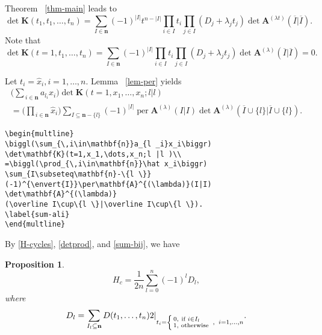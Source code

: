 \documentclass{article}
\newtheorem{prop}[thm]{Proposition}
\theoremstyle{definition}
\theoremstyle{remark}
\DeclareMathOperator{\per}{per}
\newcommand{\eval}[2][\right]{\relax
  \ifx#1\right\relax \left.\fi#2#1\rvert}
\newcommand{\envert}[1]{\left\lvert#1\right\rvert}
\begin{document}
Theorem ~\ref{thm-main} leads to
\begin{equation}\label{detK1}
\det\mathbf{K}(t_1,t_1,\dots,t_n)
=\sum_{I\in\mathbf{n}}(-1)^{\envert{I}}t^{n-\envert{I}}
\prod_{i\in I}t_i\prod_{j\in I}(D_j+\lambda_jt_j)\det\mathbf{A}
^{(\lambda t)}(\overline{I}|\overline I).
\end{equation}
Note that
\begin{equation}\label{detK2}
\det\mathbf{K}(t=1,t_1,\dots,t_n)=\sum_{I\in\mathbf{n}}(-1)^{\envert{I}}
\prod_{i\in I}t_i\prod_{j\in I}(D_j+\lambda_jt_j)\det\mathbf{A}
^{(\lambda)}(\overline{I}|\overline{I})=0.
\end{equation}

Let $t_i=\hat x_i,i=1,\dots,n$. Lemma ~\ref{lem-per} yields
\begin{multline}
\biggl(\sum_{\,i\in\mathbf{n}}a_{l _i}x_i\biggr)
\det\mathbf{K}(t=1,x_1,\dots,x_n;l |l )\\
=\biggl(\prod_{\,i\in\mathbf{n}}\hat x_i\biggr)
\sum_{I\subseteq\mathbf{n}-\{l \}}
(-1)^{\envert{I}}\per\mathbf{A}^{(\lambda)}(I|I)
\det\mathbf{A}^{(\lambda)}
(\overline I\cup\{l \}|\overline I\cup\{l \}).
\label{sum-ali}
\end{multline}
\begin{verbatim}
\begin{multline}
\biggl(\sum_{\,i\in\mathbf{n}}a_{l _i}x_i\biggr)
\det\mathbf{K}(t=1,x_1,\dots,x_n;l |l )\\
=\biggl(\prod_{\,i\in\mathbf{n}}\hat x_i\biggr)
\sum_{I\subseteq\mathbf{n}-\{l \}}
(-1)^{\envert{I}}\per\mathbf{A}^{(\lambda)}(I|I)
\det\mathbf{A}^{(\lambda)}
(\overline I\cup\{l \}|\overline I\cup\{l \}).
\label{sum-ali}
\end{multline}
\end{verbatim}

By \eqref{H-cycles}, \eqref{detprod}, and \eqref{sum-bij}, we have
\begin{prop}\label{prop:eg}
\begin{equation}
H_c=\frac1{2n}\sum^n_{l =0}(-1)^{l}
D_{l},
\end{equation}
where
\begin{equation}\label{delta-l}
D_{l}=\eval[2]{\sum_{I_{l}\subseteq \mathbf{n}}
D(t_1,\dots,t_n)}_{t_i=\left\{\begin{smallmatrix}
0,& \text{if }i\in I_{l}\quad\\%
1,& \text{otherwise}\end{smallmatrix}\right.\;,\;\; i=1,\dots,n}.
\end{equation}
\end{prop}
\end{document}
